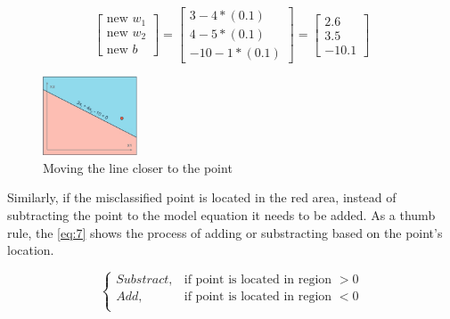 \documentclass{article}
\begin{document}
\[
\begin{bmatrix}  \text{new } w_1 \\
                 \text{new } w_2 \\
                \text{new } b \end{bmatrix} = \begin{bmatrix}
                                    3 - 4*(0.1) \\
                                    4 - 5*(0.1) \\
                                    -10 - 1*(0.1)
                                    \end{bmatrix} = \begin{bmatrix}
                                                    2.6 \\
                                                    3.5 \\
                                                    -10.1
                                                    \end{bmatrix}
\]

\begin{figure}[ht]
    \centering
    \includegraphics[width=0.25\textwidth,height=0.25\textheight,keepaspectratio]{images/new_line.png}
    \captionsetup{justification=centering}
    \caption{Moving the line closer to the point}
    \label{fig:f14}
\end{figure}

Similarly, if the misclassified point is located in the red area, instead of subtracting the point to the model equation it needs to be added. As a thumb rule, the \eqref{eq:7} shows the process of adding or substracting based on the point's location.

\begin{equation}
\label{eq:7}
  \begin{cases}
    Substract, & \text{if } \text{point is located in region } > 0 \\
    Add, & \text{if } \text{point is located in region } < 0 \\
  \end{cases}
\end{equation}  
\end{document}
